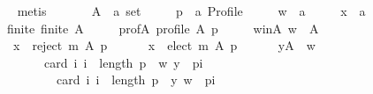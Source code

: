 \begin{isabellebody}
\ \ \ \ \isamarkupfalse%
\ metis\isanewline
{}\isamarkupfalse%
\isanewline
\ \ \isamarkupfalse%
\isanewline
\ \ \ \ A\ {\isacharcolon}{\kern0pt}{\isacharcolon}{\kern0pt}\ {\isachardoublequoteopen}{\isacharprime}{\kern0pt}a\ set{\isachardoublequoteclose}\ \isanewline
\ \ \ \ p\ {\isacharcolon}{\kern0pt}{\isacharcolon}{\kern0pt}\ {\isachardoublequoteopen}{\isacharprime}{\kern0pt}a\ Profile{\isachardoublequoteclose}\ \isanewline
\ \ \ \ w\ {\isacharcolon}{\kern0pt}{\isacharcolon}{\kern0pt}\ {\isachardoublequoteopen}{\isacharprime}{\kern0pt}a{\isachardoublequoteclose}\ \isanewline
\ \ \ \ x\ {\isacharcolon}{\kern0pt}{\isacharcolon}{\kern0pt}\ {\isachardoublequoteopen}{\isacharprime}{\kern0pt}a{\isachardoublequoteclose}\isanewline
\ \ \isamarkupfalse%
\isanewline
\ \ \ \ finite{\isacharcolon}{\kern0pt}\ {\isachardoublequoteopen}finite\ A{\isachardoublequoteclose}\ \isanewline
\ \ \ \ prof{\isacharunderscore}{\kern0pt}A{\isacharcolon}{\kern0pt}\ {\isachardoublequoteopen}profile\ A\ p{\isachardoublequoteclose}\ \isanewline
\ \ \ \ w{\isacharunderscore}{\kern0pt}in{\isacharunderscore}{\kern0pt}A{\isacharcolon}{\kern0pt}\ {\isachardoublequoteopen}w\ {\isasymin}\ A{\isachardoublequoteclose}\ \isanewline
\ \ \ \ {}{\isacharcolon}{\kern0pt}\ {\isachardoublequoteopen}x\ {\isasymin}\ reject\ m\ A\ p{\isachardoublequoteclose}\ \isanewline
\ \ \ \ {}{\isacharcolon}{\kern0pt}\ {\isachardoublequoteopen}x\ {\isasymin}\ elect\ m\ A\ p{\isachardoublequoteclose}\ \isanewline
\ \ \ \ {}{\isacharcolon}{\kern0pt}\ {\isachardoublequoteopen}{\isasymforall}y{\isasymin}A\ {\isacharminus}{\kern0pt}\ {\isacharbraceleft}{\kern0pt}w{\isacharbraceright}{\kern0pt}{\isachardot}{\kern0pt}\isanewline
\ \ \ \ \ \ \ \ \ \ card\ {\isacharbraceleft}{\kern0pt}i{\isachardot}{\kern0pt}\ i\ {\isacharless}{\kern0pt}\ length\ p\ {\isasymand}\ {\isacharparenleft}{\kern0pt}w{\isacharcomma}{\kern0pt}\ y{\isacharparenright}{\kern0pt}\ {\isasymin}\ {\isacharparenleft}{\kern0pt}p{\isacharbang}{\kern0pt}i{\isacharparenright}{\kern0pt}{\isacharbraceright}{\kern0pt}\ {\isacharless}{\kern0pt}\isanewline
\ \ \ \ \ \ \ \ \ \ \ \ card\ {\isacharbraceleft}{\kern0pt}i{\isachardot}{\kern0pt}\ i\ {\isacharless}{\kern0pt}\ length\ p\ {\isasymand}\ {\isacharparenleft}{\kern0pt}y{\isacharcomma}{\kern0pt}\ w{\isacharparenright}{\kern0pt}\ {\isasymin}\ {\isacharparenleft}{\kern0pt}p{\isacharbang}{\kern0pt}i{\isacharparenright}{\kern0pt}{\isacharbraceright}{\kern0pt}{\isachardoublequoteclose}\isanewline

\end{isabellebody}
